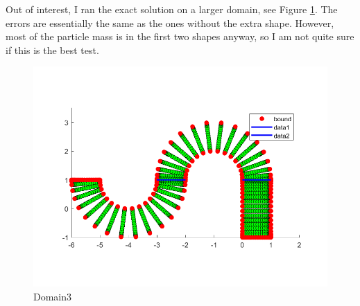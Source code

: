\documentclass[11pt, a4paper]{article}
\theoremstyle{definition}
\begin{document}
   Out of interest, I ran the exact solution on a larger domain, see Figure \ref{FD3}. The errors are essentially the same as the ones without the extra shape. However, most of the particle mass is in the first two shapes anyway, so I am not quite sure if this is the best test.
   \begin{figure}[h]
   	\centering
   	\includegraphics[scale=0.3]{D3.png}
   	\caption{Domain3} 
   	\label{FD3}
   \end{figure}
\end{document}
